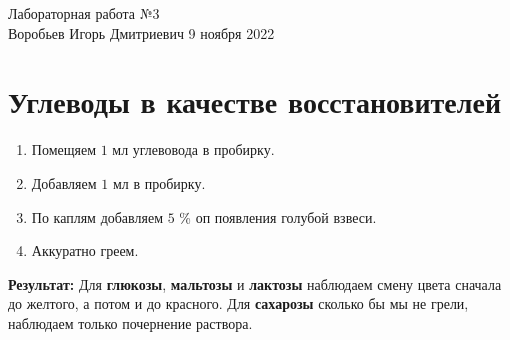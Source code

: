 \documentclass[12pt, letterpaper, twoside]{article}
\begin{document}
\begin{center}
	\LARGE{Лабораторная работа №3}\\[0.2cm]
	\large{Воробьев Игорь Дмитриевич}
	\large{9 ноября 2022}
\end{center}

\section{Углеводы в качестве восстановителей}
\begin{enumerate}
	\item Помещяем $1$ мл углевовода в пробирку.
	\item Добавляем $1$ мл  в пробирку.
	\item По каплям добавляем $5$ \%  оп появления голубой взвеси.
	\item Аккуратно греем.
\end{enumerate}
\textbf{Результат:} Для \textbf{глюкозы}, \textbf{мальтозы} и \textbf{лактозы} наблюдаем смену цвета сначала до желтого, а потом и до красного. Для \textbf{сахарозы} сколько бы мы не грели, наблюдаем только почернение раствора.
\end{document}
